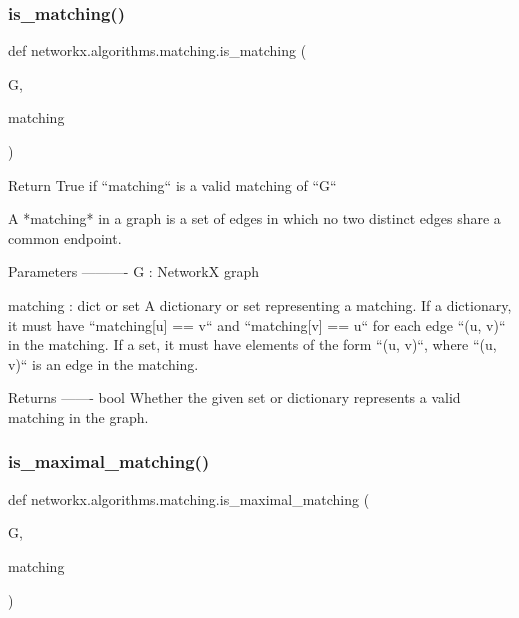 \subsubsection{\texorpdfstring{is\+\_\+matching()}{is\_matching()}}
{\footnotesize\ttfamily def networkx.\+algorithms.\+matching.\+is\+\_\+matching (\begin{DoxyParamCaption}\item[{}]{G,  }\item[{}]{matching }\end{DoxyParamCaption})}

\begin{DoxyVerb}Return True if ``matching`` is a valid matching of ``G``

A *matching* in a graph is a set of edges in which no two distinct
edges share a common endpoint.

Parameters
----------
G : NetworkX graph

matching : dict or set
    A dictionary or set representing a matching. If a dictionary, it
    must have ``matching[u] == v`` and ``matching[v] == u`` for each
    edge ``(u, v)`` in the matching. If a set, it must have elements
    of the form ``(u, v)``, where ``(u, v)`` is an edge in the
    matching.

Returns
-------
bool
    Whether the given set or dictionary represents a valid matching
    in the graph.\end{DoxyVerb}
 \mbox{\label{namespacenetworkx_1_1algorithms_1_1matching_a707c39b9fcbcdc5edc4cab754afb134b}} 
\subsubsection{\texorpdfstring{is\+\_\+maximal\+\_\+matching()}{is\_maximal\_matching()}}
{\footnotesize\ttfamily def networkx.\+algorithms.\+matching.\+is\+\_\+maximal\+\_\+matching (\begin{DoxyParamCaption}\item[{}]{G,  }\item[{}]{matching }\end{DoxyParamCaption})}

